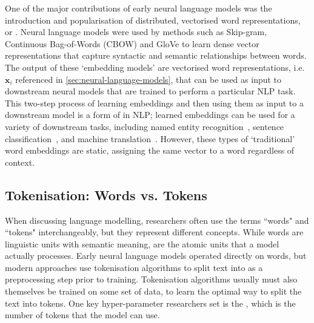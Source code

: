 One of the major contributions of early neural language models was the introduction and popularisation of distributed, vectorised word representations, or . Neural language models were used by methods such as Skip-gram, Continuous Bag-of-Words (CBOW) \citep{mikolov2013efficient, mikolov2013distributed} and GloVe \citep{pennington2014glove} to learn dense vector representations that capture syntactic and semantic relationships between words. The output of these `embedding models' are vectorised word representations, i.e. $\mathbf{x}_i$ referenced in \cref{sec:neural-language-models}, that can be used as input to downstream neural models that are trained to perform a particular NLP task. This two-step process of learning embeddings and then using them as input to a downstream model is a form of  in NLP; learned embeddings can be used for a variety of downstream tasks, including named entity recognition~\citep{lample2016neural}, sentence classification~\citep{kim2014convolutional}, and machine translation~\citep{qi2018translation}. However, these types of `traditional' word embeddings are static, assigning the same vector to a word regardless of context.


\subsection{Tokenisation: Words vs. Tokens}
\label{sec:tokens-vs-words}

When discussing language modelling, researchers often use the terms ``words" and ``tokens" interchangeably, but they represent different concepts. While words are linguistic units with semantic meaning,  are the atomic units that a model actually processes. Early neural language models operated directly on words, but modern approaches use tokenisation algorithms to split text into  as a preprocessing step prior to training. Tokenisation algorithms usually must also themselves be trained on some set of data, to learn the optimal way to split the text into tokens. One key hyper-parameter researchers set is the , which is the number of tokens that the model can use.

